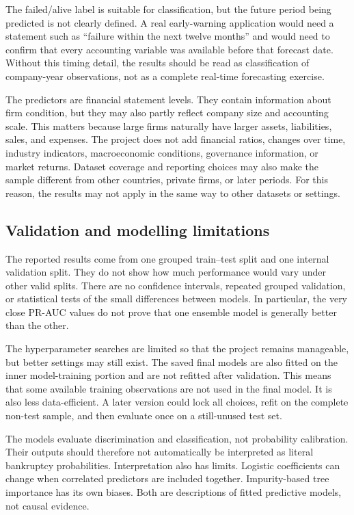 \documentclass[11pt,a4paper]{article}
\begin{document}
The failed/alive label is suitable for classification, but the future period
being predicted is not clearly defined. A real early-warning application
would need a statement such as ``failure within the next twelve months'' and
would need to confirm that every accounting variable was available before that
forecast date. Without this timing detail, the results should be read as
classification of company-year observations, not as a complete real-time
forecasting exercise.

The predictors are financial statement levels. They contain information about
firm condition, but they may also partly reflect company size and accounting
scale. This matters because large firms naturally have larger assets,
liabilities, sales, and expenses. The project does not add financial ratios,
changes over time, industry indicators, macroeconomic conditions, governance
information, or market returns. Dataset coverage and reporting choices may also
make the sample different from other countries, private firms, or later periods.
For this reason, the results may not apply in the same way to other datasets or
settings.

\subsection{Validation and modelling limitations}

The reported results come from one grouped train--test split and one internal
validation split. They do not show how much performance would vary under other
valid splits. There are no confidence intervals, repeated grouped validation,
or statistical tests of the small differences between models. In particular,
the very close PR-AUC values do not prove that one ensemble model is generally
better than the other.

The hyperparameter searches are limited so that the project remains manageable,
but better settings may still exist. The saved
final models are also fitted on the inner model-training portion and are not
refitted after validation. This means that some available training observations
are not used in the final model. It is also less data-efficient. A
later version could lock all choices, refit on the complete non-test sample, and
then evaluate once on a still-unused test set.

The models evaluate discrimination and classification, not probability
calibration. Their outputs should therefore not automatically be interpreted
as literal bankruptcy probabilities. Interpretation also has limits. Logistic
coefficients can change when correlated predictors are included together.
Impurity-based tree importance has its own biases. Both are descriptions of
fitted predictive models, not causal evidence.
\end{document}
